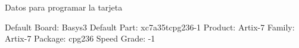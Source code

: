 Datos para programar la tarjeta

Default Board: Basys3
Default Part: xc7a35tcpg236-1
Product: Artix-7
Family: Artix-7
Package: cpg236
Speed Grade: -1







